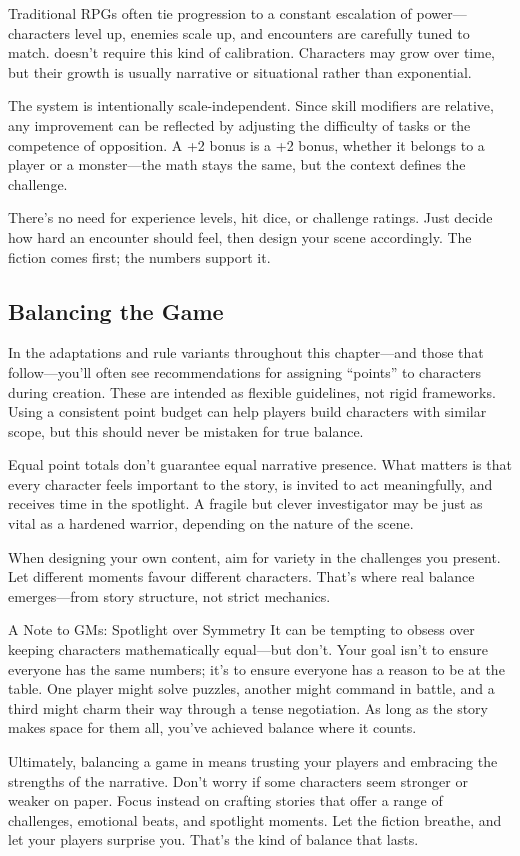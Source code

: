 Traditional RPGs often tie progression to a constant escalation of power—characters level up, enemies scale up, and encounters are carefully tuned to match. \wyrd doesn’t require this kind of calibration. Characters may grow over time, but their growth is usually narrative or situational rather than exponential.

The system is intentionally scale-independent. Since skill modifiers are relative, any improvement can be reflected by adjusting the difficulty of tasks or the competence of opposition. A +2 bonus is a +2 bonus, whether it belongs to a player or a monster—the math stays the same, but the context defines the challenge.

There’s no need for experience levels, hit dice, or challenge ratings. Just decide how hard an encounter should feel, then design your scene accordingly. The fiction comes first; the numbers support it.

\subsection{Balancing the Game}

In the adaptations and rule variants throughout this chapter—and those that follow—you’ll often see recommendations for assigning “points” to characters during creation. These are intended as flexible guidelines, not rigid frameworks. Using a consistent point budget can help players build characters with similar scope, but this should never be mistaken for true balance.

Equal point totals don’t guarantee equal narrative presence. What matters is that every character feels important to the story, is invited to act meaningfully, and receives time in the spotlight. A fragile but clever investigator may be just as vital as a hardened warrior, depending on the nature of the scene.

When designing your own content, aim for variety in the challenges you present. Let different moments favour different characters. That’s where real balance emerges—from story structure, not strict mechanics.

\begin{CommentBox}{A Note to GMs: Spotlight over Symmetry}
    It can be tempting to obsess over keeping characters mathematically equal—but don’t. Your goal isn’t to ensure everyone has the same numbers; it’s to ensure everyone has a reason to be at the table. One player might solve puzzles, another might command in battle, and a third might charm their way through a tense negotiation. As long as the story makes space for them all, you've achieved balance where it counts.
\end{CommentBox}

Ultimately, balancing a game in \wyrd means trusting your players and embracing the strengths of the narrative. Don’t worry if some characters seem stronger or weaker on paper. Focus instead on crafting stories that offer a range of challenges, emotional beats, and spotlight moments. Let the fiction breathe, and let your players surprise you. That’s the kind of balance that lasts.
